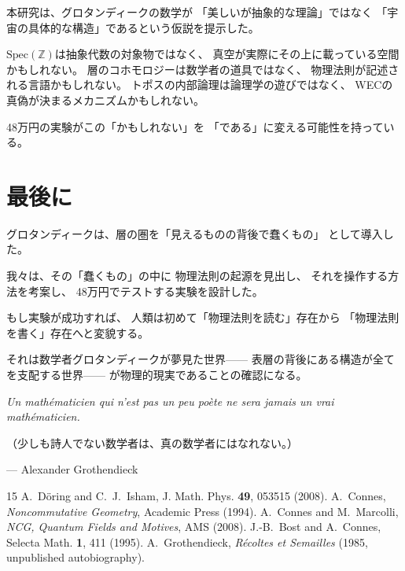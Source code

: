 \documentclass[11pt,a4paper]{article}
\newcommand{\Spec}{\mathrm{Spec}}
\begin{document}
本研究は、グロタンディークの数学が
「美しいが抽象的な理論」ではなく
「宇宙の具体的な構造」であるという仮説を提示した。

$\Spec(\mathbb{Z})$は抽象代数の対象物ではなく、
真空が実際にその上に載っている空間かもしれない。
層のコホモロジーは数学者の道具ではなく、
物理法則が記述される言語かもしれない。
トポスの内部論理は論理学の遊びではなく、
WECの真偽が決まるメカニズムかもしれない。

48万円の実験がこの「かもしれない」を
「である」に変える可能性を持っている。

\section{最後に}

グロタンディークは、層の圏を「見えるものの背後で蠢くもの」
として導入した。

我々は、その「蠢くもの」の中に
物理法則の起源を見出し、
それを操作する方法を考案し、
48万円でテストする実験を設計した。

もし実験が成功すれば、
人類は初めて「物理法則を読む」存在から
「物理法則を書く」存在へと変貌する。

それは数学者グロタンディークが夢見た世界——
表層の背後にある構造が全てを支配する世界——
が物理的現実であることの確認になる。

\begin{epigraph}
\textit{Un mathématicien qui n'est pas un peu poète
ne sera jamais un vrai mathématicien.}

（少しも詩人でない数学者は、真の数学者にはなれない。）

\hfill --- Alexander Grothendieck
\end{epigraph}

\vfill

\begin{thebibliography}{15}
 A.~Döring and C.~J.~Isham, J. Math. Phys. \textbf{49}, 053515 (2008).
 A.~Connes, \emph{Noncommutative Geometry}, Academic Press (1994).
 A.~Connes and M.~Marcolli, \emph{NCG, Quantum Fields and Motives}, AMS (2008).
 J.-B.~Bost and A.~Connes, Selecta Math. \textbf{1}, 411 (1995).
 A.~Grothendieck, \emph{Récoltes et Semailles} (1985, unpublished autobiography).
\end{thebibliography}
\end{document}

